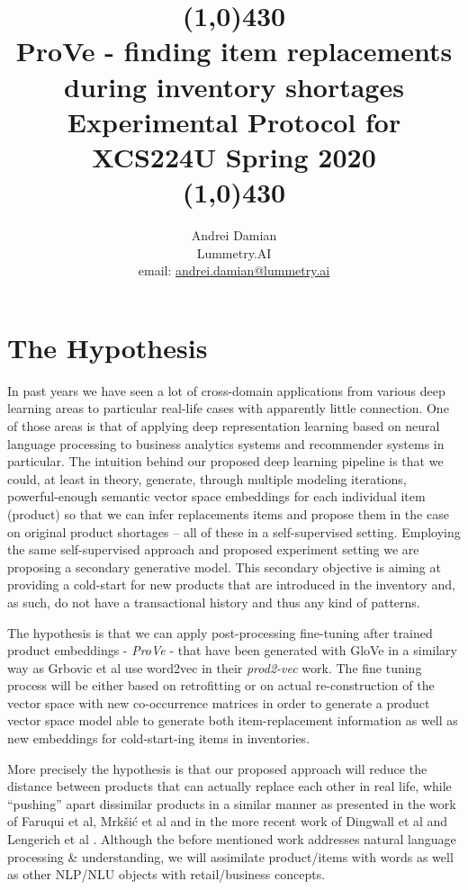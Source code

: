 \documentclass[11pt]{article}
\title{%
 \line(1,0){430}\\
 ProVe - finding item replacements during inventory shortages \\
  \large Experimental Protocol for XCS224U Spring 2020 \\
  \line(1,0){430}  
  }
\author{Andrei Damian \\ Lummetry.AI \\ email: \href{mailto:andrei.damian@lummetry.ai}{andrei.damian@lummetry.ai}}
\begin{document}
    
    \maketitle
    
    

    
    \hypertarget{the-hypothesis}{%
\section{The Hypothesis}\label{the-hypothesis}}

In past years we have seen a lot of cross-domain applications from
various deep learning areas to particular real-life cases with
apparently little connection. One of those areas is that of applying
deep representation learning based on neural language processing to
business analytics systems and recommender systems in particular. The
intuition behind our proposed deep learning pipeline is that we could,
at least in theory, generate, through multiple modeling iterations,
powerful-enough semantic vector space embeddings for each individual
item (product) so that we can infer replacements items and propose them
in the case on original product shortages -- all of these in a
self-supervised setting. Employing the same self-supervised approach and
proposed experiment setting we are proposing a secondary generative
model. This secondary objective is aiming at providing a cold-start for
new products that are introduced in the inventory and, as such, do not
have a transactional history and thus any kind of patterns.

The hypothesis is that we can apply post-processing fine-tuning after
trained product embeddings - \emph{ProVe} - that have been generated
with GloVe \cite{pennington2014glove} in a similary way as Grbovic et al
\cite{grbovic2015commerce} use word2vec \cite{mikolov2013efficient} in
their \emph{prod2-vec} \cite{grbovic2015commerce} work. The fine tuning
process will be either based on retrofitting or on actual
re-construction of the vector space with new co-occurrence matrices in
order to generate a product vector space model able to generate both
item-replacement information as well as new embeddings for
cold-start-ing items in inventories.

More precisely the hypothesis is that our proposed approach will reduce
the distance between products that can actually replace each other in
real life, while ``pushing'' apart dissimilar products in a similar
manner as presented in the work of Faruqui et
al\cite{faruqui2014retrofitting}, Mrkšić et al \cite{mrkvsic2016counter}
and in the more recent work of Dingwall et al \cite{dingwall2018mittens}
and Lengerich et al \cite{lengerich2017retrofitting} . Although the
before mentioned work addresses natural language processing \&
understanding, we will assimilate product/items with words as well as
other NLP/NLU objects with retail/business concepts.
\end{document}
